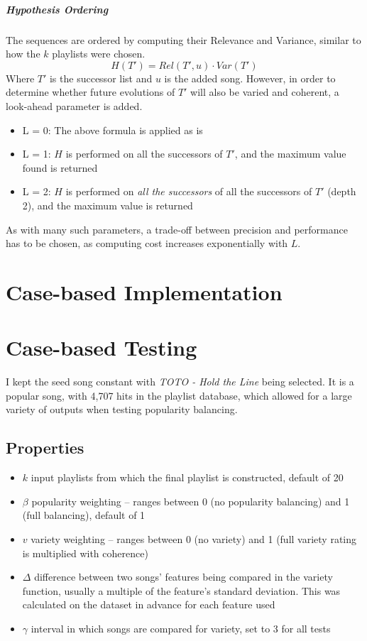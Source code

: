 \documentclass[a4paper, 12pt]{report}
\begin{document}
\paragraph{Hypothesis Ordering}
The sequences are ordered by computing their Relevance and Variance, similar to how the \(k\) playlists were chosen. 
\[H(T') = Rel(T', u) \cdot Var(T')\]
Where \(T'\) is the successor list and \(u\) is the added song. 
However, in order to determine whether future evolutions of \(T'\) will also be varied and coherent, a look-ahead parameter is added.
\begin{itemize}
    \item L = 0: The above formula is applied as is
    \item L = 1: \(H\) is performed on all the successors of \(T'\), and the maximum value found is returned 
    \item L = 2: \(H\) is performed on \emph{all the successors} of all the successors of \(T'\) (depth 2), and the maximum value is returned
\end{itemize}
As with many such parameters, a trade-off between precision and performance has to be chosen, as computing cost increases exponentially with \(L\).

\chapter{Case-based Implementation}





\chapter{Case-based Testing}
I kept the seed song constant with \textit{TOTO - Hold the Line} being selected. It is a popular song, with 4,707 hits in the playlist database,
which allowed for a large variety of outputs when testing popularity balancing.

\section{Properties}
\begin{itemize}
    \item \(k\) input playlists from which the final playlist is constructed, default of 20
    \item \(\beta\) popularity weighting -- ranges between 0 (no popularity balancing) and 1 (full balancing), default of 1
    \item \(v\) variety weighting -- ranges between 0 (no variety) and 1 (full variety rating is multiplied with coherence)
    \item \(\Delta\) difference between two songs' features being compared in the variety function, usually a multiple of the feature's standard deviation.
    This was calculated on the dataset in advance for each feature used
    \item \(\gamma\) interval in which songs are compared for variety, set to 3 for all tests
\end{itemize}
\end{document}
